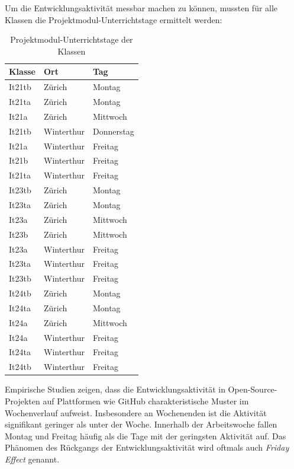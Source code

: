 Um die Entwicklungsaktivität messbar machen zu können, mussten für alle Klassen die Projektmodul-Unterrichtstage ermittelt werden:
\begin{table}[ht]
\caption{Projektmodul-Unterrichtstage der Klassen}
\label{tab:stundenplan}
\centering
\begin{tabular}{l l l}
\toprule
\textbf{Klasse} & \textbf{Ort} & \textbf{Tag} \\
\midrule
It21tb   & Zürich      & Montag      \\
It21ta   & Zürich      & Montag      \\
It21a    & Zürich      & Mittwoch    \\
It21tb   & Winterthur  & Donnerstag  \\
It21a    & Winterthur  & Freitag     \\
It21b    & Winterthur  & Freitag     \\
It21ta   & Winterthur  & Freitag     \\
\midrule
It23tb   & Zürich      & Montag      \\
It23ta   & Zürich      & Montag      \\
It23a    & Zürich      & Mittwoch    \\
It23b    & Zürich      & Mittwoch    \\
It23a    & Winterthur  & Freitag     \\
It23ta   & Winterthur  & Freitag     \\
It23tb   & Winterthur  & Freitag     \\
\midrule
It24tb   & Zürich      & Montag      \\
It24ta   & Zürich      & Montag      \\
It24a    & Zürich      & Mittwoch    \\
It24a    & Winterthur  & Freitag     \\
It24ta   & Winterthur  & Freitag     \\
It24tb   & Winterthur  & Freitag     \\
\bottomrule
\end{tabular}
\end{table}

Empirische Studien zeigen, dass die Entwicklungsaktivität in Open-Source-Projekten auf Plattformen wie GitHub charakteristische Muster im Wochenverlauf aufweist. Insbesondere an Wochenenden ist die Aktivität signifikant geringer als unter der Woche. Innerhalb der Arbeitswoche fallen Montag und Freitag häufig als die Tage mit der geringsten Aktivität auf. Das Phänomen des Rückgangs der Entwicklungsaktivität wird oftmals auch \textit{Friday Effect} genannt. \parencite{claes_programmers_2018}

